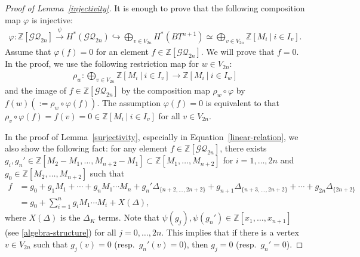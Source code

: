 \documentclass[10pt,a4paper]{amsart}
\begin{document}
\begin{proof}[Proof of Lemma~\ref{injectivity}]
It is enough to prove that the following composition map $\varphi$ is injective:
\begin{align*}
\varphi:\mathbb{Z}[\mathcal{GQ}_{2n}]\stackrel{\psi}{\longrightarrow} H^{*}(\mathcal{GQ}_{2n})\hookrightarrow \bigoplus_{v\in V_{2n}}H^{*}(BT^{n+1}) 
\simeq \bigoplus_{v\in V_{2n}}\mathbb{Z}[M_{i}\ |\ i\in I_{v}].
\end{align*}
Assume that $\varphi(f)=0$ for an element $f\in \mathbb{Z}[\mathcal{GQ}_{2n}]$. 
We will prove that $f=0$.
In the proof, we use the following restriction map for $w\in V_{2n}$: 
\begin{align*}
\rho_{w}:%
\bigoplus_{v\in V_{2n}}\mathbb{Z}[M_{i}\ |\ i\in I_{v}]
\to \mathbb{Z}[M_{i}\ |\ i\in I_{w}]
\end{align*}
and the image of $f\in \mathbb{Z}[\mathcal{GQ}_{2n}]$ by the composition map $\rho_{w}\circ \varphi$ by $f(w)(:=\rho_{w}\circ \varphi(f))$.
The assumption $\varphi(f)=0$ is equivalent to that $\rho_{v}\circ \varphi(f)=f(v)=0\in \mathbb{Z}[M_{i}\ |\ i\in I_{v}]$ for all $v\in V_{2n}$.

In the proof of Lemma~\ref{surjectivity}, especially in Equation~\eqref{linear-relation}, we also show the following fact: for any element $f\in \mathbb{Z}[\mathcal{GQ}_{2n}]$, there exists $g_{i},g_{n}'\in %
\mathbb{Z}[M_{2}-M_{1},\ldots, M_{n+2}-M_{1}] \subset \mathbb{Z}[M_{1},\ldots, M_{n+2}]$ for $i=1,\ldots, 2n$ and $g_{0}\in \mathbb{Z}[M_{2},\ldots, M_{n+2}]$ such that  
\begin{align}
\label{induction_injective}
f&=g_{0}+g_{1}M_{1}+\cdots +g_{n}M_{1}\cdots M_{n}+g_{n}'\Delta_{\{n+2,\ldots, 2n+2\}}+g_{n+1}\Delta_{\{n+3,\ldots, 2n+2\}}+\cdots 
+g_{2n}\Delta_{\{2n+2\}} \\
&=g_{0}+\sum_{i=1}^{n}{g_{i}}M_{1}\cdots M_{i}+X(\Delta), \nonumber
\end{align}
where $X(\Delta)$ is the $\Delta_{K}$ terms.
Note that $\psi(g_{j}), \psi(g_{n}')\in \mathbb{Z}[x_{1},\ldots, x_{n+1}]$ (see \eqref{algebra-structure}) for all $j=0,\ldots, 2n$.
This implies that if there is a vertex $v\in V_{2n}$ such that $g_{j}(v)=0$ (resp.~$g_{n}'(v)=0$), then $g_{j}=0$ (resp.~$g_{n}'=0$).


\end{proof}
\end{document}
